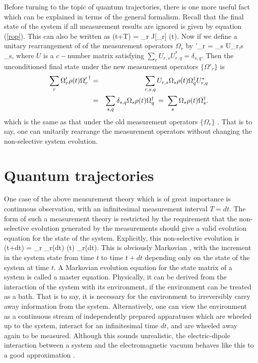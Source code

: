 Before
turning to the topic of quantum trajectories, there is one more useful fact which can
be explained in terms of the general formalism. Recall that the final state of the
system if all measurement results are ignored is given by equation (\ref{rop}). This
can also be written as \beq
\rho(t+T) = \sum_r {\cal J}[\Omega_r] \rho(t).
\eeq
Now if we define a unitary rearrangement of of the measurement operators
$\Omega_r$ by
\beq
\Omega'_r = \sum_s U_{r,s} \Omega_s,
\eeq
where $U$ is a $c-$number matrix satisfying
$
\sum_r U_{r,s} U^*_{r,q} = \delta_{s,q}.
$
Then the unconditioned final state under the new measurement operators
$\{\Omega'_r\}$ is
 \begin{eqnarray}
\sum_r \Omega'_{r} \rho(t) {\Omega'_r}^\dagger &=& 
\sum_{r,s,q} U_{r,s} \Omega_s \rho(t)
\Omega_{q}^\dagger U^*_{r,q} \\
&=& \sum_{s,q} \delta_{s,q} 
\Omega_s\rho(t)\Omega_{q}^\dagger \; = \; \sum_s 
\Omega_s\rho(t)\Omega_{s}^\dagger . \label{aeie}
\end{eqnarray}
which is the same as that under the old measurement operators
$\{\Omega_r\}$ . That is to  say, one can
unitarily rearrange the measurement operators without changing the non-selective
system evolution.

\section{Quantum trajectories}

One case of the above measurement theory which is of great 
importance is continuous observation, with an infinitesimal 
measurement interval $T=dt$. The form of such a measurement 
theory is restricted by the requirement that the non-selective evolution
generated by the measurements should give a valid evolution equation 
for the state of the system. Explicitly, this non-selective evolution is 
\beq \label{markovmeast}
\rho(t+dt) = \sum_{r} \Omega_{r}(dt) \rho(t) 
\Omega_{r}\dg (dt).
\eeq
This is obviously Markovian \cite{Gar85}, with the increment in the 
system state from time $t$ to time $t+dt$ depending only on the state 
of the system at time $t$. A Markovian 
evolution equation for the state matrix of a system is called a master 
equation. Physically, it can be derived from the interaction of the 
system with its environment, if the environment can be treated as a 
bath. That is to say, it is necessary for the environment to irreversibly 
carry away information from the system. Alternatively, one can view the
environment  as a continuous stream of independently prepared apparatuses 
which are wheeled up to the system, interact for an infinitesimal time 
$dt$, and are wheeled away again to be measured. Although this 
sounds unrealistic, the electric-dipole interaction between a system
and the electromagnetic vacuum behaves like this to a good
approximation \cite{GarParZol92,Wis95b}.

